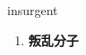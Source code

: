
\begin{frame}
{\huge insurgent}
\begin{center}
\begin{enumerate}\Large
  \item \textbf{叛乱分子}
\end{enumerate}
\end{center}
\end{frame}
